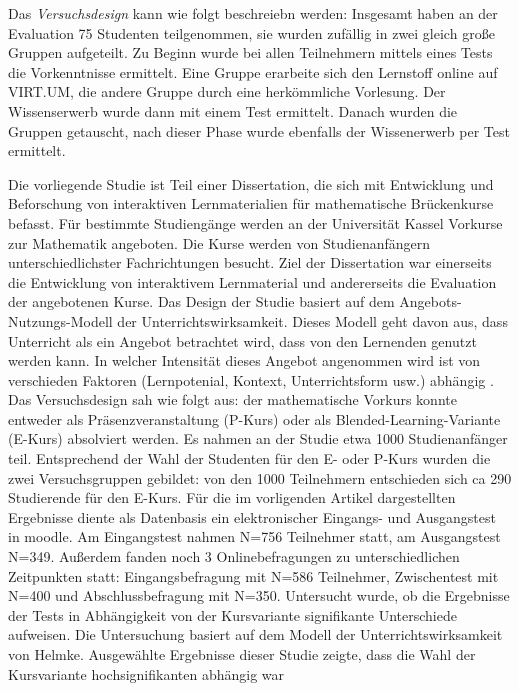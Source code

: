Das \emph{Versuchsdesign} kann wie folgt beschreiebn werden: Insgesamt
haben an der Evaluation 75 Studenten teilgenommen, sie wurden zufällig
in zwei gleich große Gruppen aufgeteilt. Zu Beginn wurde bei allen
Teilnehmern mittels eines Tests die Vorkenntnisse ermittelt. Eine Gruppe
erarbeite sich den Lernstoff online auf VIRT.UM, die andere Gruppe durch
eine herkömmliche Vorlesung. Der Wissenserwerb wurde dann mit einem Test
ermittelt. Danach wurden die Gruppen getauscht, nach dieser Phase wurde
ebenfalls der Wissenerwerb per Test ermittelt.

\textbf{}

Die vorliegende Studie ist Teil einer Dissertation, die sich mit
Entwicklung und Beforschung von interaktiven Lernmaterialien für
mathematische Brückenkurse befasst. Für bestimmte Studiengänge werden an
der Universität Kassel Vorkurse zur Mathematik angeboten. Die Kurse
werden von Studienanfängern unterschiedlichster Fachrichtungen besucht.
Ziel der Dissertation war einerseits die Entwicklung von interaktivem
Lernmaterial und andererseits die Evaluation der angebotenen Kurse. Das
Design der Studie basiert auf dem Angebots-Nutzungs-Modell der
Unterrichtswirksamkeit. Dieses Modell geht davon aus, dass Unterricht
als ein Angebot betrachtet wird, dass von den Lernenden genutzt werden
kann. In welcher Intensität dieses Angebot angenommen wird ist von
verschieden Faktoren (Lernpotenial, Kontext, Unterrichtsform usw.)
abhängig \parencite{Helmke2008}. Das Versuchsdesign sah wie folgt aus:
der mathematische Vorkurs konnte entweder als Präsenzveranstaltung
(P-Kurs) oder als Blended-Learning-Variante (E-Kurs) absolviert werden.
Es nahmen an der Studie etwa 1000 Studienanfänger teil. Entsprechend der
Wahl der Studenten für den E- oder P-Kurs wurden die zwei
Versuchsgruppen gebildet: von den 1000 Teilnehmern entschieden sich ca
290 Studierende für den E-Kurs. Für die im vorligenden Artikel
dargestellten Ergebnisse diente als Datenbasis ein elektronischer
Eingangs- und Ausgangstest in moodle. Am Eingangstest nahmen N=756
Teilnehmer statt, am Ausgangstest N=349. Außerdem fanden noch 3
Onlinebefragungen zu unterschiedlichen Zeitpunkten statt:
Eingangsbefragung mit N=586 Teilnehmer, Zwischentest mit N=400 und
Abschlussbefragung mit N=350. Untersucht wurde, ob die Ergebnisse der
Tests in Abhängigkeit von der Kursvariante signifikante Unterschiede
aufweisen. Die Untersuchung basiert auf dem Modell der
Unterrichtswirksamkeit von Helmke. Ausgewählte Ergebnisse dieser Studie
zeigte, dass die Wahl der Kursvariante hochsignifikanten abhängig war
